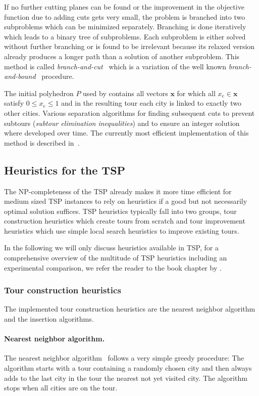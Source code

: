 \documentclass[10pt,a4paper,fleqn]{article}
\newcommand{\strong}[1]{{\normalfont\fontseries{b}\selectfont #1}}
\newcommand{\pkg}[1]{\strong{#1}}
\begin{document}
If no further cutting planes can be found or the improvement in the objective
function due to adding cuts gets very small, the problem is branched into two
subproblems which can be minimized separately. Branching is done iteratively
which leads to a binary tree of subproblems. Each subproblem is either solved
without further branching or is found to be irrelevant because its relaxed
version already produces a longer path than a solution of another subproblem.
This method is called \emph{branch-and-cut}~\citep{Padberg1990} which is a
variation of the well known \emph{branch-and-bound}~\citep{Land1960} procedure.

The initial polyhedron $P$ used by \cite{Dantzig1954} contains all vectors
$\mathbf{x}$ for which all $x_e \in \mathbf{x}$ satisfy $0 \le x_e \le 1$ and
in the resulting tour each city is linked to exactly two other cities.
Various separation algorithms for finding subsequent cuts to prevent subtours
(\emph{subtour elimination inequalities}) and to ensure an integer solution
\citep[\emph{Gomory cuts;}][]{Gomory1963} where developed over
time. The currently most efficient implementation of this method is described
in~\cite{Applegate2000}. 

\subsection{Heuristics for the TSP}\label{sec:heuristics}

The NP-completeness of the TSP already makes it more time efficient for
medium sized TSP instances to rely on heuristics if a good but not
necessarily optimal solution suffices.  TSP heuristics typically fall
into two groups, tour construction heuristics which create tours from
scratch and tour improvement heuristics which use simple local search
heuristics to improve existing tours.

In the following we will only discuss heuristics available in \pkg{TSP}, for a
comprehensive overview of the multitude of TSP heuristics including an
experimental comparison, we refer the reader to the book chapter by
\cite{Johnson2002}.

\subsubsection{Tour construction heuristics}
The implemented tour construction heuristics are the nearest neighbor algorithm
and the insertion algorithms.

\paragraph{Nearest neighbor algorithm.}
The nearest neighbor algorithm~\citep{Rosenkrantz1977} 
follows a very simple greedy procedure:
The algorithm starts with a tour containing a randomly chosen city and then
always adds to the last city in the tour the nearest not yet visited
city. The algorithm stops when all cities are on the tour.  
\end{document}
